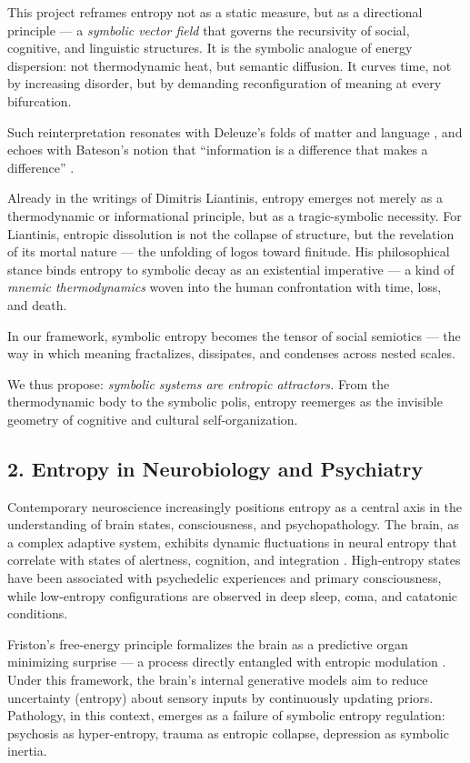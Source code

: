 This project reframes entropy not as a static measure, but as a directional principle — a \textit{symbolic vector field} that governs the recursivity of social, cognitive, and linguistic structures. It is the symbolic analogue of energy dispersion: not thermodynamic heat, but semantic diffusion. It curves time, not by increasing disorder, but by demanding reconfiguration of meaning at every bifurcation.

Such reinterpretation resonates with Deleuze's folds of matter and language \cite{deleuze1993}, and echoes with Bateson's notion that “information is a difference that makes a difference” \cite{bateson1979}.

Already in the writings of Dimitris Liantinis, entropy emerges not merely as a thermodynamic or informational principle, but as a tragic-symbolic necessity. For Liantinis, entropic dissolution is not the collapse of structure, but the revelation of its mortal nature — the unfolding of logos toward finitude. His philosophical stance binds entropy to symbolic decay as an existential imperative — a kind of \textit{mnemic thermodynamics} woven into the human confrontation with time, loss, and death.

In our framework, symbolic entropy becomes the tensor of social semiotics — the way in which meaning fractalizes, dissipates, and condenses across nested scales.

We thus propose: \textit{symbolic systems are entropic attractors.} From the thermodynamic body to the symbolic polis, entropy reemerges as the invisible geometry of cognitive and cultural self-organization.

\subsection*{2. Entropy in Neurobiology and Psychiatry}

Contemporary neuroscience increasingly positions entropy as a central axis in the understanding of brain states, consciousness, and psychopathology. The brain, as a complex adaptive system, exhibits dynamic fluctuations in neural entropy that correlate with states of alertness, cognition, and integration \cite{carhart2014, tagliazucchi2016}. High-entropy states have been associated with psychedelic experiences and primary consciousness, while low-entropy configurations are observed in deep sleep, coma, and catatonic conditions.

Friston’s free-energy principle formalizes the brain as a predictive organ minimizing surprise — a process directly entangled with entropic modulation \cite{fristonFreeenergyPrincipleUnified2010}. Under this framework, the brain's internal generative models aim to reduce uncertainty (entropy) about sensory inputs by continuously updating priors. Pathology, in this context, emerges as a failure of symbolic entropy regulation: psychosis as hyper-entropy, trauma as entropic collapse, depression as symbolic inertia.

